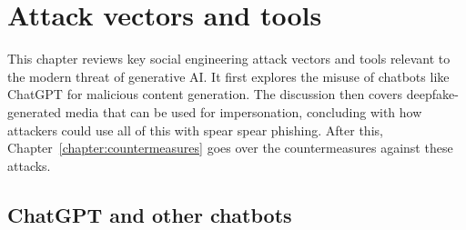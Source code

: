 



\chapter{Attack vectors and tools \label{chapter:attacks}}
\begin{comment}

Guides:
    - About 3-4 pages

TODO:
    [ ] 

What to cover:
    - Attacks
        - Deepfake generated synthetic media
            - Videos
            - Images
            - Audio
            - Real-time voice morphing

Sections:
    - Attack Vectors and Tools
        - Chatbots
        - Deepfake-generated media
        - Phishing & spear phishing

\end{comment}

This chapter reviews key social engineering attack vectors and tools relevant to the modern threat of generative AI. It first explores the misuse of chatbots like ChatGPT for malicious content generation. The discussion then covers deepfake-generated media that can be used for impersonation, concluding with how attackers could use all of this with spear spear phishing. After this, Chapter~\ref{chapter:countermeasures} goes over the countermeasures against these attacks.














\section{ChatGPT and other chatbots}

\begin{comment}

What to cover:
    - Mitä ovat chatbotit kuten ChatGPT
    - How Generative AI can be used by both cybersecurity professionals and threat actors
    - Circumventing ChatGPT's ethical restrictions with, for example prompt injections attacks or reverse psychology (with at least 1-2 examples)
    - How scholars and regular users have found ways to bypass ChatGPT's ethical restrictions??
    - Tekoälyn päivitys kun löydetään uusia tapoja ohittaa sen eettiset ohjeistukset ja kehittäjien asettamat rajoitukset
    - Pyydetään tekoälyä roolipelaamaan social engineering skenaarioita
    - Kielioppi ja kirjoitusvirheiden korjaus scam viesteissä
    
\end{comment}

